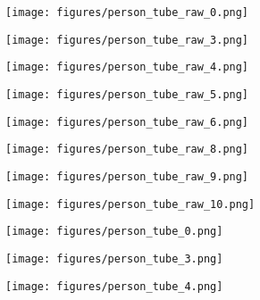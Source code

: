 \begin{figure}[h]
  \centering
\begin{subfigure}{0.12\textwidth}
	\texttt{[image: figures/person\_tube\_raw\_0.png]}
\end{subfigure}%
\begin{subfigure}{0.12\textwidth}
	\texttt{[image: figures/person\_tube\_raw\_3.png]}
\end{subfigure}%
\begin{subfigure}{0.12\textwidth}
	\texttt{[image: figures/person\_tube\_raw\_4.png]}
\end{subfigure}%
\begin{subfigure}{0.12\textwidth}
	\texttt{[image: figures/person\_tube\_raw\_5.png]}
\end{subfigure}%
\begin{subfigure}{0.12\textwidth}
	\texttt{[image: figures/person\_tube\_raw\_6.png]}
\end{subfigure}%
\begin{subfigure}{0.12\textwidth}
	\texttt{[image: figures/person\_tube\_raw\_8.png]}
\end{subfigure}%
\begin{subfigure}{0.12\textwidth}
	\texttt{[image: figures/person\_tube\_raw\_9.png]}
\end{subfigure}%
\begin{subfigure}{0.12\textwidth}
	\texttt{[image: figures/person\_tube\_raw\_10.png]}
\end{subfigure}
\begin{subfigure}{0.12\textwidth}
	\texttt{[image: figures/person\_tube\_0.png]}
\end{subfigure}%
\begin{subfigure}{0.12\textwidth}
	\texttt{[image: figures/person\_tube\_3.png]}
\end{subfigure}%
\begin{subfigure}{0.12\textwidth}
	\texttt{[image: figures/person\_tube\_4.png]}
\end{subfigure}%
\begin{subfigure}{0.12\textwidth}

\end{subfigure}
\end{figure}
